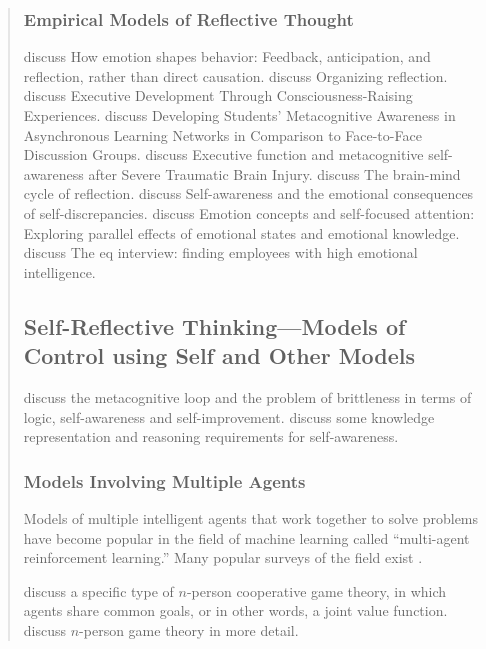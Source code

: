 \begin{quotation}
\subsubsection{Empirical Models of Reflective Thought}


\cite{baumeister2007esb} discuss How emotion shapes behavior: Feedback, anticipation, and reflection, rather than direct causation.
\cite{vince2002or} discuss Organizing reflection.
\cite{mirvis2008edt} discuss Executive Development Through Consciousness-Raising Experiences.
\cite{michalsky2007dsm} discuss Developing Students' Metacognitive Awareness in Asynchronous Learning Networks in Comparison to Face-to-Face Discussion Groups.
\cite{bivona2008efa} discuss Executive function and metacognitive self-awareness after Severe Traumatic Brain Injury.
\cite{irannejad2001bmc} discuss The brain-mind cycle of reflection.
\cite{phillips2005saa} discuss Self-awareness and the emotional consequences of self-discrepancies.
\cite{silvia2006eca} discuss Emotion concepts and self-focused attention: Exploring parallel effects of emotional states and emotional knowledge.
\cite{lynn2008eif3} discuss The eq interview: finding employees with high emotional intelligence.


\subsection{Self-Reflective Thinking---Models of Control using Self and Other Models}

\cite{anderson2005lsa} discuss the metacognitive loop and the problem of brittleness in terms of logic, self-awareness and self-improvement.
\cite{schubert2005skr} discuss some knowledge representation and reasoning requirements for self-awareness.

\subsubsection{Models Involving Multiple Agents}

Models of multiple intelligent agents that work together to solve problems have become popular in the field of machine learning called ``multi-agent reinforcement learning.''
Many popular surveys of the field exist \cite[]{wei1995aal} \cite[]{sen1999lms} \cite[]{stone2000mss} \cite[]{shoham2004mar} \cite[]{yang2004mrl} \cite[]{panait2005cma}.

\cite{boutilier1996pla} discuss a specific type of $n$-person cooperative game theory, in which agents share common goals, or in other words, a joint value function.
\cite{rapoport2001npg} discuss $n$-person game theory in more detail.
	      

\end{quotation}
